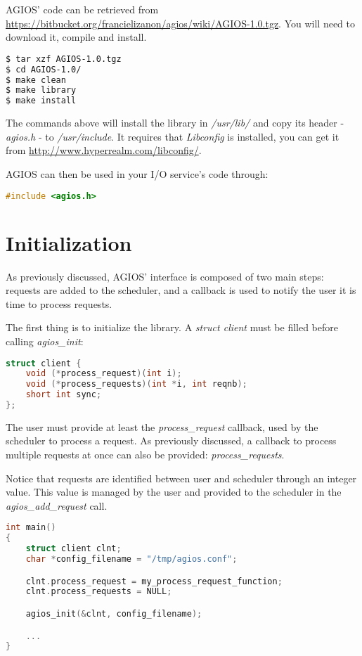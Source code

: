 AGIOS' code can be retrieved from \url{https://bitbucket.org/francielizanon/agios/wiki/AGIOS-1.0.tgz}. You will need to download it, compile and install.

\begin{lstlisting}[language=bash]
$ tar xzf AGIOS-1.0.tgz
$ cd AGIOS-1.0/
$ make clean
$ make library
$ make install
\end{lstlisting}

The commands above will install the library in \emph{/usr/lib/} and copy its header - \emph{agios.h} -  to \emph{/usr/include}. It requires that \emph{Libconfig} is installed, you can get it from \url{http://www.hyperrealm.com/libconfig/}. 

AGIOS can then be used in your I/O service's code through:

\begin{lstlisting}[language=C]
#include <agios.h>
\end{lstlisting}

\section{Initialization}

As previously discussed, AGIOS' interface is composed of two main steps: requests are added to the scheduler, and a callback is used to notify the user it is time to process requests. 

The first thing is to initialize the library. A \emph{struct client} must be filled before calling \emph{agios\_init}:

\begin{lstlisting}[language=C]
struct client {
	void (*process_request)(int i);
	void (*process_requests)(int *i, int reqnb);
	short int sync; 
};
\end{lstlisting}

The user must provide at least the \emph{process\_request} callback, used by the scheduler to process a request. As previously discussed, a callback to process multiple requests at once can also be provided: \emph{process\_requests}. 

Notice that requests are identified between user and scheduler through an integer value. This value is managed by the user and provided to the scheduler in the \emph{agios\_add\_request} call.

\begin{lstlisting}[language=C]
int main()
{
	struct client clnt;
	char *config_filename = "/tmp/agios.conf";

	clnt.process_request = my_process_request_function;
	clnt.process_requests = NULL;

	agios_init(&clnt, config_filename);

	...
}
\end{lstlisting}

